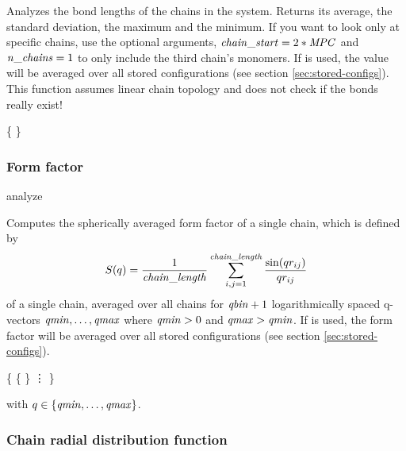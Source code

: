 Analyzes the bond lengths of the chains in the system.  Returns its average, the
standard deviation, the maximum and the minimum.  If you want to look
only at specific chains, use the optional arguments, \ie $\var{chain\_start} =
2*\var{MPC}$ and $\var{n\_chains} = 1$ to only include the third
chain's monomers. If  is used, the value will be
averaged over all stored configurations (see section
\vref{sec:stored-configs}).
This function assumes linear chain topology and does not check 
if the bonds really exist!

\begin{code}
\{     \}
\end{code}

\subsubsection{Form factor}
\begin{essyntax}
  analyze  
    \\
\end{essyntax}

Computes the spherically averaged form factor of a single chain, which
is defined by
\begin{equation}
  S(q) = \frac{1}{\var{chain\_length}} \sum_{i,j=1}^{\var{chain\_length}}
  \frac{\sin(q r_{ij})}{q r_{ij}}
\end{equation}
of a single chain, averaged over all chains for $\var{qbin}+1$
logarithmically spaced q-vectors $\var{qmin}, \dots ,\var{qmax}$ where
$\var{qmin}>0$ and $\var{qmax}>\var{qmin}$.  If  is
used, the form factor will be averaged over all stored configurations
(see section \vref{sec:stored-configs}).


\begin{code}
\{
  \{   \}
  \vdots
\}
\end{code}
with $q \in \{\var{qmin},\dots,\var{qmax}\}$.

\subsubsection{Chain radial distribution function}


